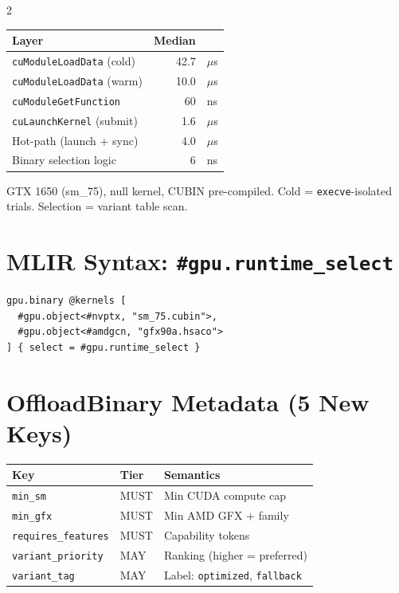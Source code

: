 \documentclass[10pt,a4paper]{article}
\begin{document}
\begin{multicols}{2}
\begin{center}
\small
\begin{tabular}{@{}lrl@{}}
\toprule
\textbf{Layer} & \textbf{Median} & \\
\midrule
\texttt{cuModuleLoadData} (cold)   & 42.7 & $\mu$s \\
\texttt{cuModuleLoadData} (warm)   & 10.0 & $\mu$s \\
\texttt{cuModuleGetFunction}       &   60 & ns \\
\texttt{cuLaunchKernel} (submit)   &  1.6 & $\mu$s \\
Hot-path (launch + sync)           &  4.0 & $\mu$s \\
Binary selection logic             &    6 & ns \\
\bottomrule
\end{tabular}
\end{center}

\vspace{1pt}
{\scriptsize GTX 1650 (sm\_75), null kernel, CUBIN pre-compiled.
Cold = \texttt{execve}-isolated trials. Selection = variant table scan.}

\section{MLIR Syntax: \texttt{\#gpu.runtime\_select}}

\begin{lstlisting}
gpu.binary @kernels [
  #gpu.object<#nvptx, "sm_75.cubin">,
  #gpu.object<#amdgcn, "gfx90a.hsaco">
] { select = #gpu.runtime_select }
\end{lstlisting}

\section{OffloadBinary Metadata (5 New Keys)}

\begin{center}
\small
\begin{tabular}{@{}llp{3.2cm}@{}}
\toprule
\textbf{Key} & \textbf{Tier} & \textbf{Semantics} \\
\midrule
\texttt{min\_sm}             & MUST & Min CUDA compute cap \\
\texttt{min\_gfx}            & MUST & Min AMD GFX + family \\
\texttt{requires\_features}  & MUST & Capability tokens \\
\texttt{variant\_priority}   & MAY  & Ranking (higher = preferred) \\
\texttt{variant\_tag}        & MAY  & Label: \texttt{optimized}, \texttt{fallback} \\
\bottomrule
\end{tabular}
\end{center}


\end{multicols}
\end{document}
